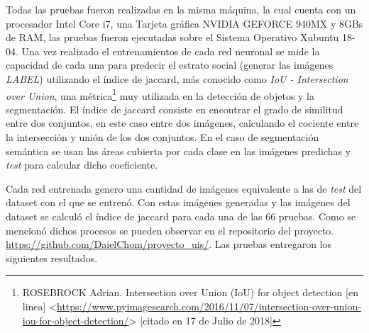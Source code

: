 Todas las pruebas fueron realizadas en la misma máquina, la cual cuenta con un procesador Intel Core i7, una Tarjeta gráfica NVIDIA GEFORCE 940MX y 8GBs de RAM, las pruebas fueron ejecutadas sobre el Sistema Operativo Xubuntu 18-04. Una vez realizado el entrenamientos de cada red neuronal se mide la capacidad de cada una para predecir el estrato social (generar las imágenes \textit{LABEL}) utilizando el índice de jaccard, más conocido como  \textit{IoU  - Intersection over Union}, una métrica\footnote[14]{ROSEBROCK Adrian. Intersection over Union (IoU) for object detection [en linea] <\url{https://www.pyimagesearch.com/2016/11/07/intersection-over-union-iou-for-object-detection/}> [citado en 17 de Julio de 2018]} muy utilizada en la detección de objetos y la segmentación. El índice de jaccard consiste en encontrar el grado de similitud entre dos conjuntos, en este caso entre dos imágenes, calculando el cociente entre la intersección y unión de los dos conjuntos. En el caso de segmentación semántica se usan las áreas cubierta por cada clase en las imágenes predichas y \textit{test} para calcular dicho coeficiente.  



Cada red entrenada genero una cantidad de imágenes equivalente a las de \textit{test} del dataset con el que se entrenó. Con estas imágenes generadas y las imágenes del dataset se calculó el índice de jaccard para cada una de las 66 pruebas. Como se mencionó dichos procesos se pueden observar en el repositorio del proyecto. \url{https://github.com/DaielChom/proyecto_uis/}. Las pruebas entregaron los siguientes resultados. 


